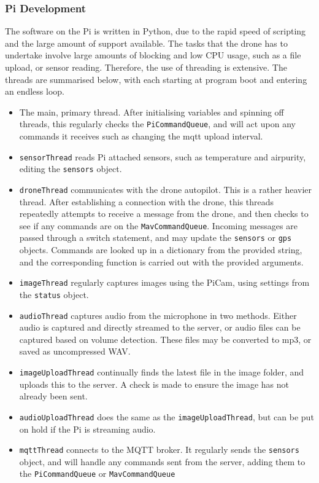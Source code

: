 \documentclass{article}
\begin{document}
\subsubsection{Pi Development}
The software on the Pi is written in Python, due to the rapid speed of scripting and the large amount of support available. The tasks that the drone has to undertake involve large amounts of blocking and low CPU usage, such as a file upload, or sensor reading. Therefore, the use of threading is extensive. The threads are summarised below, with each starting at program boot and entering an endless loop. 
\begin{itemize}
	\item The main, primary thread. After initialising variables and spinning off threads, this regularly checks the \texttt{PiCommandQueue}, and will act upon any commands it receives such as changing the mqtt upload interval.
	\item \texttt{sensorThread} reads Pi attached sensors, such as temperature and airpurity, editing the \texttt{sensors} object.
	\item \texttt{droneThread} communicates with the drone autopilot. This is a rather heavier thread. After establishing a connection with the drone, this threads repeatedly attempts to receive a message from the drone, and then checks to see if any commands are on the \texttt{MavCommandQueue}. Incoming messages are passed through a switch statement, and may update the \texttt{sensors} or \texttt{gps} objects. Commands are looked up in a dictionary from the provided string, and the corresponding function is carried out with the provided arguments. 
	\item \texttt{imageThread} regularly captures images using the PiCam, using settings from the \texttt{status} object.
	\item \texttt{audioThread} captures audio from the microphone in two methods. Either audio is captured and directly streamed to the server, or audio files can be captured based on volume detection. These files may be converted to mp3, or saved as uncompressed WAV.
	\item \texttt{imageUploadThread} continually finds the latest file in the image folder, and uploads this to the server. A check is made to ensure the image has not already been sent.
	\item \texttt{audioUploadThread} does the same as the \texttt{imageUploadThread}, but can be put on hold if the Pi is streaming audio.
	\item \texttt{mqttThread} connects to the MQTT broker. It regularly sends the \texttt{sensors} object, and will handle any commands sent from the server, adding them to the \texttt{PiCommandQueue} or \texttt{MavCommandQueue}
\end{itemize}
\end{document}
